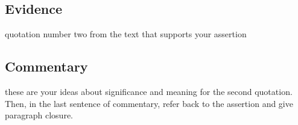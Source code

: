 \documentclass[11pt]{article}
\begin{document}
\subsection*{Evidence}
\label{sec:org6c55faf}
quotation number two from the text that supports your assertion
\subsection*{Commentary}
\label{sec:org592796b}
these are your ideas about significance and meaning for the second quotation. Then, in the last sentence of commentary, refer back to the assertion and give paragraph closure. \\
\end{document}
